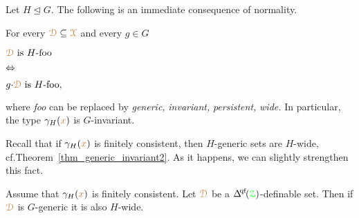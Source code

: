 Let $H\trianglelefteq G$.
The following is an immediate consequence of normality.

\begin{remark}\label{rem_invariance_normalsubg}
\newlength{\ceqlength}
\settowidth{\ceqlength}{p(x) is H-invariant\ }
\def\medrel#1{\parbox[t]{5ex}{$\displaystyle\hfil #1$}}
\def\ceq#1#2#3{\parbox[t]{\ceqlength}{$\displaystyle #1$}\medrel{#2}{$\displaystyle #3$}}
%
  For every ${\color{brown}\EuScript D}\subseteq{\color{brown}\EuScript X}$ and every $g\in G$
  
  \ceq{\hfill\mrD\textrm{ is }H\textrm{-foo}}{\IFF}{g{\cdot}\mrD\textrm{ is }H\textrm{-foo},}
  
  where \textit{foo\/} can be replaced by \textit{generic,} \textit{invariant,} \textit{persistent,} \textit{wide.}
  In particular, the type $\gamma_H({\color{brown} x})$ is $G$-invariant.
\end{remark}

Recall that if $\gamma_H({\color{brown} x})$ is finitely consistent, then $H$-generic sets are $H$-wide, cf.\@ Theorem~\ref{thm_generic_invariant2}.
As it happens, we can slightly strengthen this fact.

\begin{proposition}\label{prop_Ggeneric_Hpersistent}
  Assume that $\gamma_H({\color{brown} x})$ is finitely consistent.
  Let ${\color{brown}\EuScript D}$ be a $\qfDelta(\grZ)$-definable set.
  Then if ${\color{brown}\EuScript D}$ is $G$-generic it is also $H$-wide.
\end{proposition}

